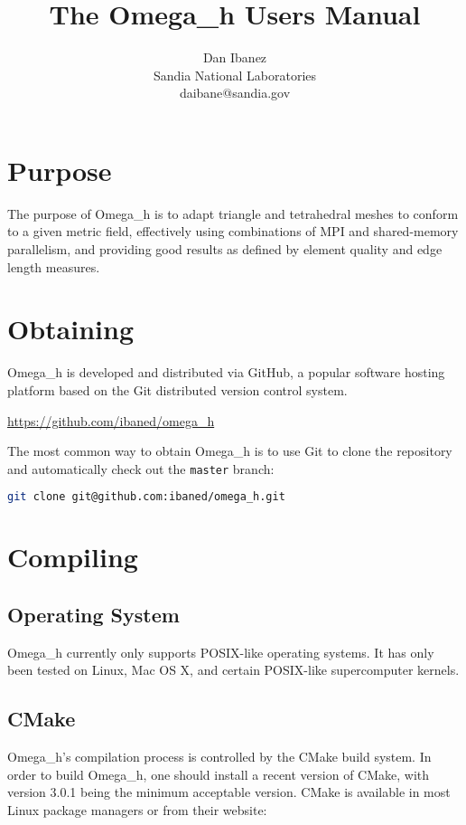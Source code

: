 \documentclass{article}
\title{The Omega\_h Users Manual}
\author{Dan Ibanez\\
Sandia National Laboratories\\
daibane@sandia.gov}
\begin{document}
\maketitle

\section{Purpose}

The purpose of Omega\_h is to adapt triangle and tetrahedral
meshes to conform to a given metric field,
effectively using combinations of MPI and shared-memory parallelism,
and providing good results as defined by element quality and
edge length measures.

\section{Obtaining}

Omega\_h is developed and distributed via GitHub,
a popular software hosting platform based on the
Git distributed version control system.

\url{https://github.com/ibaned/omega_h}

The most common way to obtain Omega\_h is to
use Git to clone the repository and automatically
check out the \texttt{master} branch:

\begin{lstlisting}[language=bash]
git clone git@github.com:ibaned/omega_h.git
\end{lstlisting}

\section{Compiling}

\subsection{Operating System}

Omega\_h currently only supports POSIX-like operating systems.
It has only been tested on Linux, Mac OS X, and certain POSIX-like
supercomputer kernels.

\subsection{CMake}

Omega\_h's compilation process is controlled by the CMake
build system.
In order to build Omega\_h, one should install a recent
version of CMake, with version 3.0.1 being the minimum
acceptable version.
CMake is available in most Linux package managers
or from their website:
\end{document}
